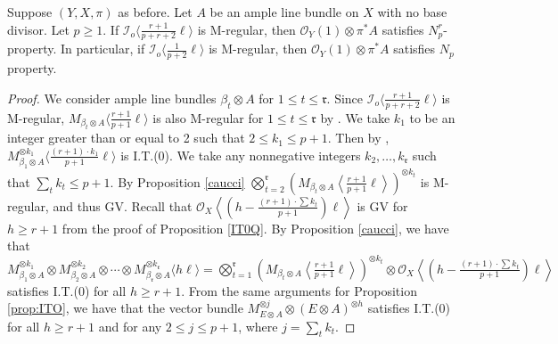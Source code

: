 \documentclass[11pt,letter]{amsart}
\numberwithin{equation}{section}
\begin{document}
\begin{thm}\label{thm:5.4}
Suppose $(Y,X,\pi)$ as before. 
Let $A$ be an ample line bundle on $X$ with no base divisor. Let $p\geq 1$.
 If $\mathcal{I}_o\langle \frac{r+1}{p+r+2}\ell\rangle$ is M-regular, then $\mathcal{O}_Y(1)\otimes\pi^*A$ satisfies $N_p^r$-property.  
 In particular, if $\mathcal{I}_o\langle \frac{1}{p+2}\ell\rangle$ is M-regular, then $\mathcal{O}_Y(1)\otimes\pi^*A$ satisfies $N_p$ property. 
\end{thm}
\begin{proof}
 We consider ample line bundles $\beta_t\otimes A$ for $1\leq t\leq \mathfrak{r}$. Since $\mathcal{I}_o\langle\frac{r+1}{p+r+2}\ell\rangle$ is M-regular, $M_{\beta_t\otimes A}\langle\frac{r+1}{p+1}\ell\rangle$ is also M-regular for $1\leq t\leq\mathfrak{r}$ by \cite[Proposition 4.1]{Ito22}. 
 We take $k_1$ to be an integer greater than or equal to 2 such that $2\leq k_1\leq p+1$. Then by \cite[Proposition 6.2]{Ito22}, $M_{\beta_1\otimes A}^{\otimes k_1}\langle\frac{(r+1)\cdot k_1}{p+1}\ell\rangle$ is I.T.(0). We take any nonnegative integers $k_2,\ldots,k_{\mathfrak{r}}$ such that $\sum_tk_t\leq p+1$. By Proposition \ref{caucci}
 $\bigotimes_{t=2}^\mathfrak{r} \left(M_{\beta_t\otimes A}\left\langle\frac{r+1}{p+1}\ell\right\rangle\right)^{\otimes k_t}$ is M-regular, and thus GV. Recall that $\mathcal{O}_X\left\langle \left(h-\frac{(r+1)\cdot\sum k_t}{p+1}\right)\ell\right\rangle$ is GV for $h\geq r+1$ from the proof of Proposition \ref{IT0Q}. By Proposition \ref{caucci}, we have that    
$M_{\beta_1\otimes A}^{\otimes k_1}\otimes M_{\beta_2\otimes A}^{\otimes k_2}\otimes\cdots\otimes M_{\beta_{\mathfrak{r}}\otimes A}^{\otimes k_\mathfrak{r}}\langle h\ell\rangle=\bigotimes_{t=1}^\mathfrak{r} \left(M_{\beta_t\otimes A}\left\langle\frac{r+1}{p+1}\ell\right\rangle\right)^{\otimes k_t}\otimes \mathcal{O}_X\left\langle \left(h-\frac{(r+1)\cdot\sum k_t}{p+1}\right)\ell\right\rangle$ satisfies I.T.(0) for all $h\geq r+1$. From the same arguments for Proposition \ref{prop:ITO}, we have that the vector bundle $M_{E\otimes A}^{\otimes j}\otimes (E\otimes A)^{\otimes h}$ satisfies I.T.(0) for all $h\geq r+1$ and for any $2\leq j\leq p+1$, where $j=\sum_tk_t$.
 


\end{proof}
\end{document}

